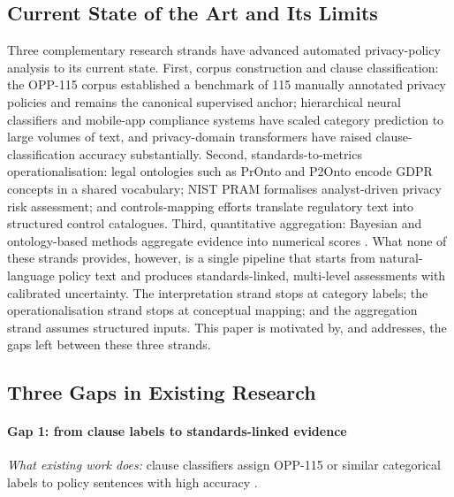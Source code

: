 \documentclass[final,3p,times,twocolumn]{elsarticle}
\begin{document}
	\subsection{Current State of the Art and Its Limits}
	\label{sec:sota} Three complementary research strands have advanced automated privacy-policy analysis to its current state. First, corpus construction and clause classification:	the OPP-115 corpus \citep{wilson2016opp115} established a benchmark of 115 manually annotated privacy policies and remains the canonical supervised anchor; hierarchical neural classifiers \citep{harkous2018polisis} and mobile-app compliance systems \citep{zimmeck2019maps} have scaled category prediction to large	volumes of text, and privacy-domain transformers \citep{srinath2021privaseer,muralitharan2024privacybertlstm} have raised clause-classification accuracy substantially. Second, standards-to-metrics operationalisation: legal ontologies such as PrOnto \citep{palmirani2018pronto} and P2Onto \citep{novikova2025privacyrisks} encode GDPR concepts in a shared vocabulary; NIST PRAM \citep{brooks2017nistpram} formalises analyst-driven privacy risk assessment; and controls-mapping efforts translate regulatory text into structured control catalogues. Third, quantitative aggregation: Bayesian and ontology-based methods aggregate evidence into numerical scores \citep{novikova2025privacyrisks,oetzel2014pia}.	What none of these strands provides, however, is a single pipeline that starts from natural-language policy text and produces standards-linked, multi-level assessments with calibrated uncertainty. The interpretation strand stops at category labels; the operationalisation strand stops at conceptual mapping; and the aggregation strand assumes structured inputs. This paper is motivated by, and addresses, the gaps left between these three strands. 
    
	\subsection{Three Gaps in Existing Research}
	\paragraph{Gap 1: from clause labels to standards-linked evidence}
    
	\emph{What existing work does:} clause classifiers assign OPP-115 or similar categorical labels to policy sentences with high accuracy \citep{harkous2018polisis,srinath2021privaseer,muralitharan2024privacybertlstm}.
    
\end{document}

